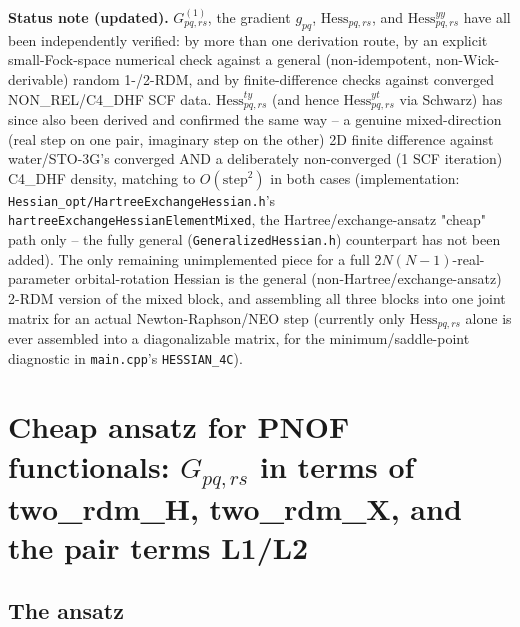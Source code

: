 \documentclass[11pt]{article}
\begin{document}
\bigskip
\noindent\textbf{Status note (updated).} $G^{(1)}_{pq,rs}$, the gradient $g_{pq}$,
$\text{Hess}_{pq,rs}$, and $\text{Hess}^{yy}_{pq,rs}$ have all been independently
verified: by more than one derivation route, by an explicit small-Fock-space
numerical check against a general (non-idempotent, non-Wick-derivable) random
1-/2-RDM, and by finite-difference checks against converged NON\_REL/C4\_DHF SCF
data. $\text{Hess}^{ty}_{pq,rs}$ (and hence $\text{Hess}^{yt}_{pq,rs}$ via Schwarz)
has since also been derived and confirmed the same way -- a genuine
mixed-direction (real step on one pair, imaginary step on the other) 2D finite
difference against water/STO-3G's converged AND a deliberately non-converged
(1 SCF iteration) C4\_DHF density, matching to $O(\text{step}^2)$ in both cases
(implementation: \texttt{Hessian\_opt/HartreeExchangeHessian.h}'s
\texttt{hartreeExchangeHessianElementMixed}, the Hartree/exchange-ansatz "cheap"
path only -- the fully general (\texttt{GeneralizedHessian.h}) counterpart has not
been added). The only remaining unimplemented piece for a full $2N(N-1)$-real-parameter
orbital-rotation Hessian is the general (non-Hartree/exchange-ansatz) 2-RDM version
of the mixed block, and assembling all three blocks into one joint matrix for an
actual Newton-Raphson/NEO step (currently only $\text{Hess}_{pq,rs}$ alone is ever
assembled into a diagonalizable matrix, for the minimum/saddle-point diagnostic in
\texttt{main.cpp}'s \texttt{HESSIAN\_4C}).

\section{Cheap ansatz for PNOF functionals: $G_{pq,rs}$ in terms of
two\_rdm\_H, two\_rdm\_X, and the pair terms L1/L2}
\label{sec:pnof-hessian}

\subsection*{The ansatz}
\end{document}
